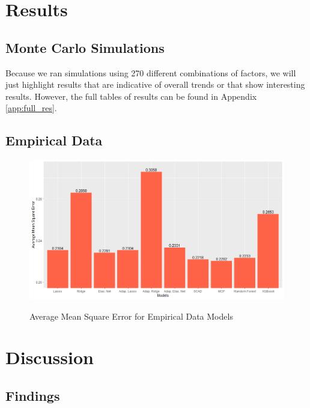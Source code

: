 \documentclass{article}
\begin{document}
\section{Results}


\subsection{Monte Carlo Simulations}

Because we ran simulations using 270 different combinations of factors, we will just highlight results that are indicative of overall trends or that show interesting results. However, the full tables of results can be found in Appendix \ref{app:full_res}.

\subsection{Empirical Data}

\begin{figure}[h!]
	\centering
	\includegraphics[width = 0.9\linewidth]{images/empirical_cv_mse.png}
	\label{fig:empirical_mse}
	\caption{Average Mean Square Error for Empirical Data Models}
\end{figure}
\section{Discussion}
\subsection{Findings}
\end{document}
